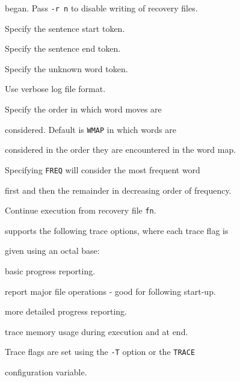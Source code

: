 \begin{optlist}
        began.  Pass {\tt -r n} to disable writing of recovery files.





   Specify the sentence start token.





   Specify the sentence end token.





   Specify the unknown word token.





   Use verbose log file format.





   Specify the order in which word moves are


        considered. Default is {\tt WMAP} in which words are


        considered in the order they are encountered in the word map.


        Specifying {\tt FREQ} will consider the most frequent word


        first and then the remainder in decreasing order of frequency.





   Continue execution from recovery file {\tt fn}.





\end{optlist}












 supports the following trace options, where each trace flag is 


given using an octal base:


\begin{optlist}


   basic progress reporting. 


   report major file operations - good for following start-up.


   more detailed progress reporting.


   trace memory usage during execution and at end.


\end{optlist}


Trace flags are set using the \texttt{-T} option or the \texttt{TRACE}


configuration variable.




